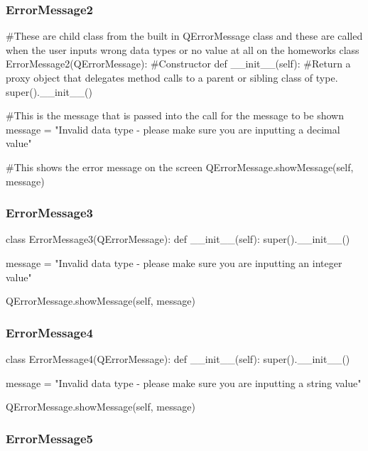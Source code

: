 \begin{landscape}
\subsubsection{ErrorMessage2}

\begin{python}
#These are child class from the built in QErrorMessage class and these are called when the user inputs wrong data types or no value at all on the homeworks
class ErrorMessage2(QErrorMessage):
    #Constructor
    def __init__(self):
        #Return a proxy object that delegates method calls to a parent or sibling class of type.
        super().__init__()
        
        #This is the message that is passed into the call for the message to be shown
        message = "Invalid data type - please make sure you are inputting a decimal value"

        #This shows the error message on the screen
        QErrorMessage.showMessage(self, message)
\end{python}

\subsubsection{ErrorMessage3}

\begin{python}
class ErrorMessage3(QErrorMessage):
    def __init__(self):
        super().__init__()
        
        message = "Invalid data type - please make sure you are inputting an integer value"
        
        QErrorMessage.showMessage(self, message)
\end{python}

\subsubsection{ErrorMessage4}

\begin{python}
class ErrorMessage4(QErrorMessage):
    def __init__(self):
        super().__init__()
        
        message = "Invalid data type - please make sure you are inputting a string value"
        
        QErrorMessage.showMessage(self, message)
\end{python}

\subsubsection{ErrorMessage5}


\end{landscape}
